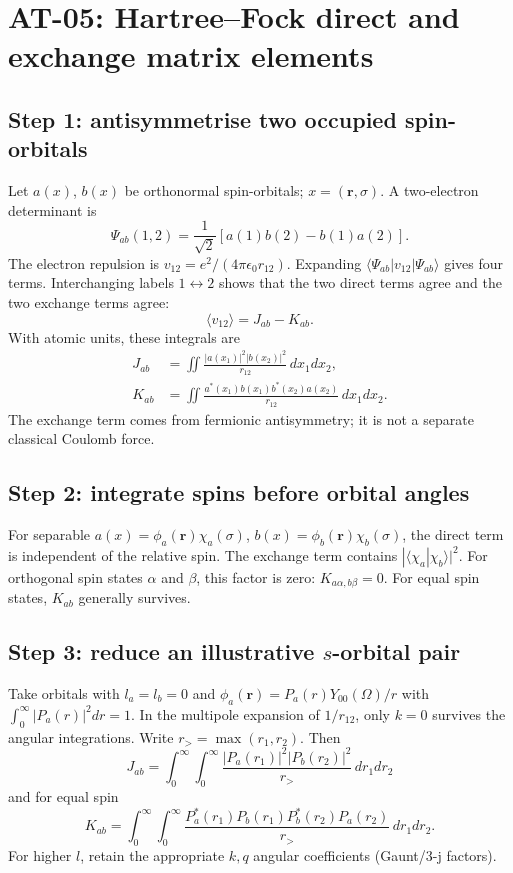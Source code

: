 
\section{AT-05: Hartree--Fock direct and exchange matrix elements}
\subsection*{Step 1: antisymmetrise two occupied spin-orbitals}
Let \(a(x)\), \(b(x)\) be orthonormal spin-orbitals;
\(x=(\mathbf r,\sigma)\). A two-electron determinant is
\[
\Psi_{ab}(1,2)=\frac1{\sqrt2}
\left[a(1)b(2)-b(1)a(2)\right].
\]
The electron repulsion is \(v_{12}=e^2/(4\pi\epsilon_0r_{12})\).
Expanding \(\langle\Psi_{ab}|v_{12}|\Psi_{ab}\rangle\)
gives four terms. Interchanging labels \(1\leftrightarrow2\)
shows that the two direct terms agree and the two exchange
terms agree:
\[
\boxed{\langle v_{12}\rangle=J_{ab}-K_{ab}}.
\]
With atomic units, these integrals are
\[
\begin{aligned}
J_{ab}&=\iint
\frac{|a(x_1)|^2|b(x_2)|^2}{r_{12}}\,dx_1dx_2,\\
K_{ab}&=\iint
\frac{a^*(x_1)b(x_1)b^*(x_2)a(x_2)}{r_{12}}
\,dx_1dx_2.
\end{aligned}
\]
The exchange term comes from fermionic antisymmetry;
it is not a separate classical Coulomb force.

\subsection*{Step 2: integrate spins before orbital angles}
For separable \(a(x)=\phi_a(\mathbf r)\chi_a(\sigma)\),
\(b(x)=\phi_b(\mathbf r)\chi_b(\sigma)\), the direct term
is independent of the relative spin. The exchange term
contains \(|\langle\chi_a|\chi_b\rangle|^2\).
For orthogonal spin states \(\alpha\) and \(\beta\),
this factor is zero: \(\boxed{K_{a\alpha,b\beta}=0}\).
For equal spin states, \(K_{ab}\) generally survives.

\subsection*{Step 3: reduce an illustrative \(s\)-orbital pair}
Take orbitals with \(l_a=l_b=0\) and
\(\phi_a(\mathbf r)=P_a(r)Y_{00}(\Omega)/r\)
with \(\int_0^\infty |P_a(r)|^2dr=1\).
In the multipole expansion of \(1/r_{12}\),
only \(k=0\) survives the angular integrations.
Write \(r_>=\max(r_1,r_2)\). Then
\[
\boxed{J_{ab}=\int_0^\infty\!\int_0^\infty
\frac{|P_a(r_1)|^2|P_b(r_2)|^2}{r_>}
\,dr_1dr_2}
\]
and for equal spin
\[
\boxed{K_{ab}=\int_0^\infty\!\int_0^\infty
\frac{P_a^*(r_1)P_b(r_1)P_b^*(r_2)P_a(r_2)}
{r_>}\,dr_1dr_2}.
\]
For higher \(l\), retain the appropriate
\(k,q\) angular coefficients (Gaunt/3-j factors).

